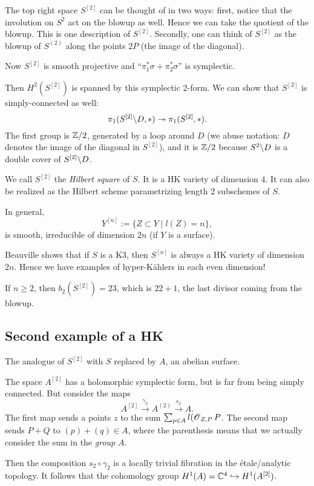 \documentclass[11pt, english]{article}
\begin{document}
The top right space $S^{[2]}$ can be thought of in two ways: first, notice that the involution on $S^2$ act on the blowup as well. Hence we can take the quotient of the blowup. This is one description of $S^{[2]}$. Secondly, one can think of $S^{[2]}$ as the blowup of $S^{(2)}$ along the points $2P$ (the image of the diagonal). 

Now $S^{[2]}$ is smooth projective and ``$\pi_1^\ast \sigma + \pi_2^\ast \sigma$'' is symplectic.

Then $H^2(S^{[2]})$ is spanned by this symplectic 2-form. We can show that $S^{[2]}$ is simply-connected as well:
$$
\pi_1(S^{[2]} \backslash D,\ast) \twoheadrightarrow \pi_1(S^{[2]},\ast).
$$
The first group is $\mathbb{Z}/2$, generated by a loop around $D$ (we abuse notation: $D$ denotes the image of the diagonal in $S^{[2]}$), and it is $\mathbb{Z}/2$ because $S^2  \backslash D$ is a double cover of $S^{[2]} \backslash D$.

We call $S^{[2]}$ the \emph{Hilbert square} of $S$. It is a HK variety of dimension $4$. It can also be realized as the Hilbert scheme parametrizing length 2 subschemes of $S$.

In general,
$$
Y^{[n]} := \{  Z \subset Y  \mid l(Z) = n \},
$$
is smooth, irreducible of dimension $2n$ (if $Y$ is a surface).

Beauville shows that if $S$ is a K3, then $S^{[n]}$ is always a HK variety of dimension $2n$. Hence we have examples of hyper-Kählers in each even dimension!

If $n\geq 2$, then $b_2(S^{[2]})= 23$, which is $22+1$, the last divisor coming from the blowup. 

\subsection{Second example of a HK}

The analogue of $S^{[2]}$ with $S$ replaced by $A$, an abelian surface.

The space $A^{[2]}$ has a holomorphic symplectic form, but is far from being simply connected. But consider the maps
$$
A^{[2]} \xrightarrow{\gamma_2} A^{(2)} \xrightarrow{s_2} A .
$$
The first map sends a points $z$ to the sum $\sum_{p \in A} l(\operatorname{\mathscr{O}}_{Z,P} P $. The second map sends $P+Q$ to $(p) + (q) \in A$, where the parenthesis means that we actually consider the sum in the \emph{group} $A$.

Then the composition $s_2 \circ \gamma_2$ is a locally trivial fibration in the étale/analytic topology. It follows that the cohomology group $H^1(A)=\mathbb{C}^4 \hookrightarrow H^1(A^{[2]})$. 
\end{document}

